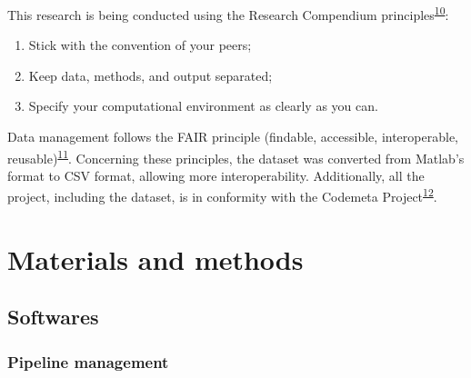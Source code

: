 \documentclass[12pt,twoside]{fmupthesis}
\providecommand{\tightlist}{%
  \setlength{\itemsep}{0pt}\setlength{\parskip}{0pt}}
\begin{document}
This research is being conducted using the Research Compendium principles\textsuperscript{\protect\hyperlink{ref-compendium2019}{10}}:
\begin{enumerate}
\def\labelenumi{\arabic{enumi}.}
\tightlist
\item
  Stick with the convention of your peers;
\item
  Keep data, methods, and output separated;
\item
  Specify your computational environment as clearly as you can.
\end{enumerate}
Data management follows the FAIR principle (findable, accessible, interoperable, reusable)\textsuperscript{\protect\hyperlink{ref-wilkinson2016}{11}}. Concerning these principles, the dataset was converted from Matlab's format to
CSV format, allowing more interoperability. Additionally, all the project, including the dataset, is
in conformity with the Codemeta Project\textsuperscript{\protect\hyperlink{ref-CodeMeta2017}{12}}.

\hypertarget{materials-and-methods}{%
\chapter{Materials and methods}\label{materials-and-methods}}

\hypertarget{softwares}{%
\section{Softwares}\label{softwares}}

\hypertarget{pipeline-management}{%
\subsection{Pipeline management}\label{pipeline-management}}
\end{document}

